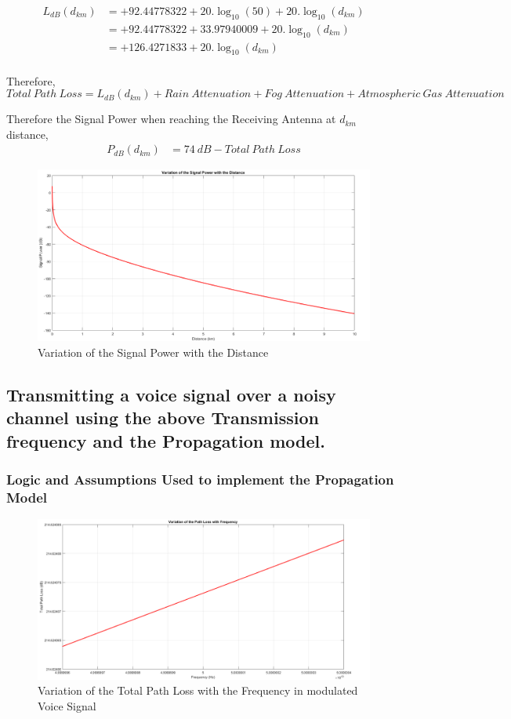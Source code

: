 \documentclass[a4paper,11pt]{article}%
\begin{document}
\[
\begin{split}
L_{dB}(d_{km})&= +92.44778322+20.\log_{10}(50) + 20.\log_{10}(d_{km})\\
&=+92.44778322+ 33.97940009 + 20.\log_{10}(d_{km})\\
&=+126.4271833+ 20.\log_{10}(d_{km})\\
\end{split}
\]

Therefore, \[Total~Path~Loss = L_{dB}(d_{km}) + Rain~Attenuation+Fog~Attenuation+Atmospheric~Gas~Attenuation \]

Therefore the Signal Power when reaching the Receiving Antenna at $d_{km}$ distance,
\[
\begin{split}
P_{dB}(d_{km}) & =74~dB - Total~Path~Loss
\end{split}
\]

\begin{figure}[!h]
	\centering
	\includegraphics[scale=0.35]{figures/sp}
	\caption{Variation of the Signal Power with the Distance}
\end{figure}
\pagebreak

\subsection{Transmitting a voice signal over a noisy channel using the above Transmission frequency and the Propagation model.}
\vspace{5mm}
\subsubsection{Logic and Assumptions Used to implement the Propagation Model}

\begin{figure}[!h]
	\centering
	\includegraphics[scale = 0.36]{figures/voicePL}
	\caption{Variation of the Total Path Loss with the Frequency in modulated Voice Signal}
\end{figure}
\end{document}
